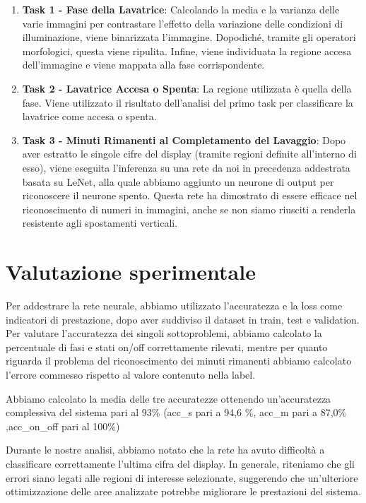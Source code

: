 \documentclass{article}
\begin{document}
\begin{enumerate}
\item
  \textbf{Task 1 - Fase della Lavatrice}: Calcolando la media e la
  varianza delle varie immagini per contrastare l'effetto della
  variazione delle condizioni di illuminazione, viene binarizzata
  l'immagine. Dopodiché, tramite gli operatori morfologici, questa viene
  ripulita. Infine, viene individuata la regione accesa dell'immagine e
  viene mappata alla fase corrispondente.
\item
  \textbf{Task 2 - Lavatrice Accesa o Spenta}: La regione utilizzata è
  quella della fase. Viene utilizzato il risultato dell'analisi del
  primo task per classificare la lavatrice come accesa o spenta.
\item
  \textbf{Task 3 - Minuti Rimanenti al Completamento del Lavaggio}: Dopo
  aver estratto le singole cifre del display (tramite regioni definite
  all'interno di esso), viene eseguita l'inferenza su una rete da noi in
  precedenza addestrata basata su LeNet, alla quale abbiamo aggiunto un
  neurone di output per riconoscere il neurone spento. Questa rete ha
  dimostrato di essere efficace nel riconoscimento di numeri in
  immagini, anche se non siamo riusciti a renderla resistente agli
  spostamenti verticali.
\end{enumerate}

\section{Valutazione sperimentale}\label{valutazione-sperimentale}

\par Per addestrare la rete neurale, abbiamo utilizzato l'accuratezza e la
loss come indicatori di prestazione, dopo aver suddiviso il dataset in
train, test e validation. Per valutare l'accuratezza dei singoli
sottoproblemi, abbiamo calcolato la percentuale di fasi e stati on/off
correttamente rilevati, mentre per quanto riguarda il problema del
riconoscimento dei minuti rimanenti abbiamo calcolato l'errore commesso
rispetto al valore contenuto nella label.

\par Abbiamo calcolato la media delle tre accuratezze ottenendo
un'accuratezza complessiva del sistema pari al 93\% (acc\_s pari a 94,6
\%, acc\_m pari a 87,0\% ,acc\_on\_off pari al 100\%)

\par Durante le nostre analisi, abbiamo notato che la rete ha avuto
difficoltà a classificare correttamente l'ultima cifra del display. In
generale, riteniamo che gli errori siano legati alle regioni di
interesse selezionate, suggerendo che un'ulteriore ottimizzazione delle
aree analizzate potrebbe migliorare le prestazioni del sistema.
\end{document}
